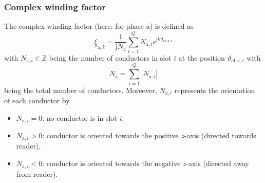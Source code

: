 \begin{frame}
	\frametitle{Complex winding factor}
    \onslide<+->
    The complex winding factor (here: for phase a) is defined as
    \begin{equation}
        \underline{\xi}_{\mathrm{a},k} = \frac{1}{\mathrm{j}N_\mathrm{a}}\sum_{i=1}^{Q} N_{\mathrm{a},i}e^{\mathrm{j}k\vartheta_{\mathrm{el},\mathrm{a},i}}
        \label{eq:Complex_winding_factor_definition}
    \end{equation} 
    with $N_{\mathrm{a},i}\in \mathbb{Z}$ being the number of conductors in slot $i$ at the position $\vartheta_{\mathrm{el},\mathrm{a},i}$ \onslide<+-> with 
    \begin{equation}
        N_\mathrm{a} = \sum_{i=1}^{Q} |N_{\mathrm{a},i}|
        \label{eq:Complex_winding_factor_total_number_conductors}
    \end{equation}
    being the total number of conductors. \onslide<+-> Moreover, $N_{\mathrm{a},i}$ represents the orientation of each conductor by
    \begin{itemize}
        \item $N_{\mathrm{a},i} = 0$: no conductor is in slot $i$,
        \item<+-> $N_{\mathrm{a},i} >0 $: conductor is oriented towards the positive $z$-axis (directed towards reader),
        \item<+-> $N_{\mathrm{a},i} <0 $: conductor is oriented towards the negative $z$-axis (directed away from reader).
    \end{itemize}
\end{frame}

